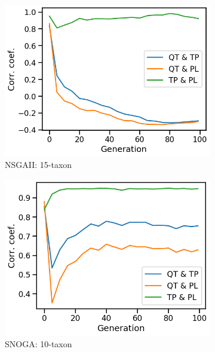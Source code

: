 \begin{figure}[!htbp]
\begin{subfigure}[b]{0.33\textwidth}
			\includegraphics[width=\textwidth]{Figure/15-taxon_NSGAII_corr_plot}
			\caption{NSGAII: 15-taxon}
\end{subfigure}    
		\begin{subfigure}[b]{0.33\textwidth}
			\includegraphics[width=\textwidth]{Figure/10-taxon_NOSSGA_corr_plot}
			\caption{SNOGA: 10-taxon}
\end{subfigure}\begin{subfigure}[b]{0.33\textwidth}

\end{subfigure}
\end{figure}
